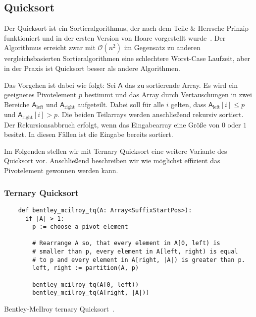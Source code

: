 \subsection{Quicksort}
\label{section:quicksort}

Der  Quicksort ist ein Sortieralgorithmus,
der nach dem Teile \& Herrsche Prinzip funktioniert und
in der ersten Version von Hoare vorgestellt wurde~\cite{quicksort}.
Der Algorithmus erreicht zwar mit $\mathcal O(n^2)$ im Gegensatz zu anderen
vergleichsbasierten Sortieralgorithmen eine schlechtere Worst-Case Laufzeit,
aber in der Praxis ist Quicksort besser als andere Algorithmen.

Das Vorgehen ist dabei wie folgt: Sei $\mathsf{A}$ das zu sortierende Array.
Es wird ein geeignetes Pivotelement $p$ bestimmt und das Array durch Vertauschungen in
zwei Bereiche $\mathsf{A}_{\text{left}}$ und $\mathsf{A}_{\text{right}}$ aufgeteilt.
Dabei soll für alle $i$ gelten, dass $\mathsf{A}_{\text{left}}[i] \le p$ und $\mathsf{A}_{\text{right}}[i] > p$.
Die beiden Teilarrays werden anschließend rekursiv sortiert.
Der Rekursionsabbruch erfolgt, wenn das Eingabearray eine Größe von $0$ oder $1$ besitzt.
In diesen Fällen ist die Eingabe bereits sortiert.

Im Folgenden stellen wir mit Ternary Quicksort eine weitere Variante des Quicksort vor.
Anschließend beschreiben wir wie möglichst effizient das Pivotelement gewonnen werden kann.

\subsubsection{Ternary Quicksort}
\label{section:ternary_quicksort}

\begin{listing}[!h]
    \begin{verbatim}
    def bentley_mcilroy_tq(A: Array<SuffixStartPos>):
      if |A| > 1:
        p := choose a pivot element
    
        # Rearrange A so, that every element in A[0, left) is
        # smaller than p, every element in A[left, right) is equal
        # to p and every element in A[right, |A|) is greater than p.
        left, right := partition(A, p)
    
        bentley_mcilroy_tq(A[0, left))
        bentley_mcilroy_tq(A[right, |A|))
    \end{verbatim}
    \caption{Bentley-McIlroy ternary Quicksort~\cite{ternary_quicksort}.}
\end{listing}    

